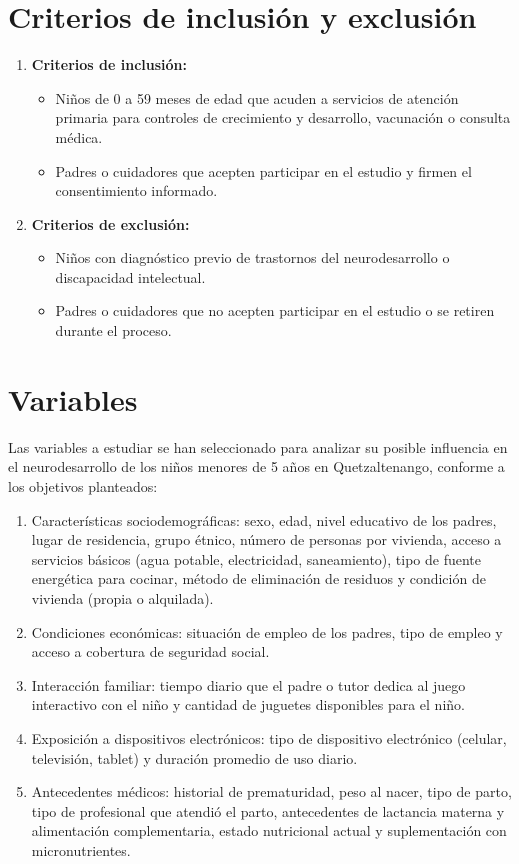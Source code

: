 \documentclass[11pt,letterpaper]{report}
\begin{document}
\section{Criterios de inclusión y exclusión}
\begin{enumerate}
	\item \textbf{Criterios de inclusión:}
		\begin{itemize}
		\item Niños de 0 a 59 meses de edad que acuden a servicios de atención
		primaria para controles de crecimiento y desarrollo, vacunación o
		consulta médica.
		\item Padres o cuidadores que acepten participar en el estudio y firmen
		el consentimiento informado. 
		\end{itemize}
	\item \textbf{Criterios de exclusión:}
		\begin{itemize}
		\item Niños con diagnóstico previo de trastornos del neurodesarrollo o
		discapacidad intelectual. 
		\item Padres o cuidadores que no acepten participar en el estudio o se
		retiren durante el proceso.
		\end{itemize}
\end{enumerate}

\section{Variables}
Las variables a estudiar se han seleccionado para analizar su posible
influencia en el neurodesarrollo de los niños menores de 5 años en
Quetzaltenango, conforme a los objetivos planteados:
\begin{enumerate}
	\item Características sociodemográficas: sexo, edad, nivel educativo de los padres,
lugar de residencia, grupo étnico, número de personas por vivienda, acceso a                          servicios básicos (agua potable, electricidad, saneamiento), tipo de fuente
energética para cocinar, método de eliminación de residuos y condición de
vivienda (propia o alquilada).
	\item Condiciones económicas: situación de empleo de los padres, tipo de empleo y
acceso a cobertura de seguridad social.
	\item Interacción familiar: tiempo diario que el padre o tutor dedica al juego
interactivo con el niño y cantidad de juguetes disponibles para el niño.
	\item Exposición a dispositivos electrónicos: tipo de dispositivo electrónico
(celular, televisión, tablet) y duración promedio de uso diario.
	\item Antecedentes médicos: historial de prematuridad, peso al nacer, tipo de parto,
tipo de profesional que atendió el parto, antecedentes de lactancia materna y
alimentación complementaria, estado nutricional actual y suplementación con
micronutrientes.
\end{enumerate}
\end{document}
